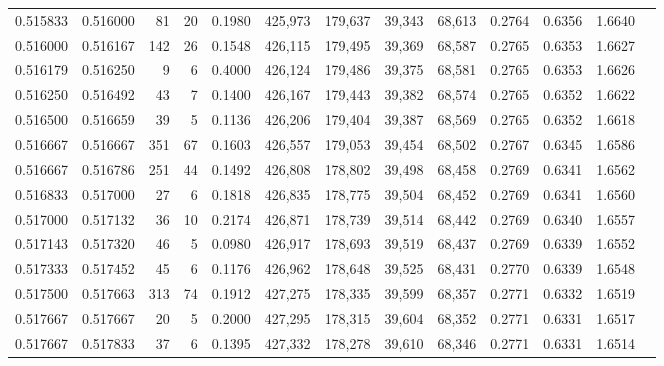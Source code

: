 \begin{tabular}{rrrrrrrrrrrrr}
0.515833 & 0.516000 &    81 &  20 &                                     0.1980 & 425,973 & 179,637 &  39,343 &  68,613 & 0.2764 & 0.6356 & 1.6640 \\
0.516000 & 0.516167 &   142 &  26 &                                     0.1548 & 426,115 & 179,495 &  39,369 &  68,587 & 0.2765 & 0.6353 & 1.6627 \\
0.516179 & 0.516250 &     9 &   6 &                                     0.4000 & 426,124 & 179,486 &  39,375 &  68,581 & 0.2765 & 0.6353 & 1.6626 \\
0.516250 & 0.516492 &    43 &   7 &                                     0.1400 & 426,167 & 179,443 &  39,382 &  68,574 & 0.2765 & 0.6352 & 1.6622 \\
0.516500 & 0.516659 &    39 &   5 &                                     0.1136 & 426,206 & 179,404 &  39,387 &  68,569 & 0.2765 & 0.6352 & 1.6618 \\
0.516667 & 0.516667 &   351 &  67 &                                     0.1603 & 426,557 & 179,053 &  39,454 &  68,502 & 0.2767 & 0.6345 & 1.6586 \\
0.516667 & 0.516786 &   251 &  44 &                                     0.1492 & 426,808 & 178,802 &  39,498 &  68,458 & 0.2769 & 0.6341 & 1.6562 \\
0.516833 & 0.517000 &    27 &   6 &                                     0.1818 & 426,835 & 178,775 &  39,504 &  68,452 & 0.2769 & 0.6341 & 1.6560 \\
0.517000 & 0.517132 &    36 &  10 &                                     0.2174 & 426,871 & 178,739 &  39,514 &  68,442 & 0.2769 & 0.6340 & 1.6557 \\
0.517143 & 0.517320 &    46 &   5 &                                     0.0980 & 426,917 & 178,693 &  39,519 &  68,437 & 0.2769 & 0.6339 & 1.6552 \\
0.517333 & 0.517452 &    45 &   6 &                                     0.1176 & 426,962 & 178,648 &  39,525 &  68,431 & 0.2770 & 0.6339 & 1.6548 \\
0.517500 & 0.517663 &   313 &  74 &                                     0.1912 & 427,275 & 178,335 &  39,599 &  68,357 & 0.2771 & 0.6332 & 1.6519 \\
0.517667 & 0.517667 &    20 &   5 &                                     0.2000 & 427,295 & 178,315 &  39,604 &  68,352 & 0.2771 & 0.6331 & 1.6517 \\
0.517667 & 0.517833 &    37 &   6 &                                     0.1395 & 427,332 & 178,278 &  39,610 &  68,346 & 0.2771 & 0.6331 & 1.6514 \\

\end{tabular}
